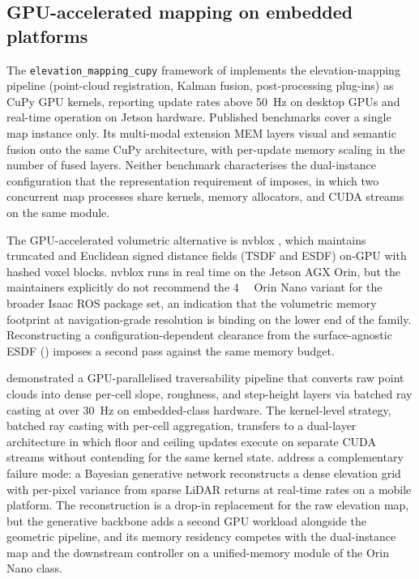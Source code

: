 \documentclass[11pt,a4paper]{article}
\begin{document}
\subsection{GPU-accelerated mapping on embedded platforms}
\label{sec:sq6:mapping}

The \texttt{elevation\_mapping\_cupy} framework of \citet{mikiElevationMappingLocomotion2022} implements the elevation-mapping pipeline (point-cloud registration, Kalman fusion, post-processing plug-ins) as CuPy GPU kernels, reporting update rates above \SI{50}{\hertz} on desktop GPUs and real-time operation on Jetson hardware. Published benchmarks cover a single map instance only. Its multi-modal extension MEM \citep{erniMEMMultiModalElevation2023} layers visual and semantic fusion onto the same CuPy architecture, with per-update memory scaling in the number of fused layers. Neither benchmark characterises the dual-instance configuration that the representation requirement of  imposes, in which two concurrent map processes share kernels, memory allocators, and CUDA streams on the same module.

The GPU-accelerated volumetric alternative is nvblox \citep{millaneNvbloxGPUAcceleratedIncremental2024}, which maintains truncated and Euclidean signed distance fields (TSDF and ESDF) on-GPU with hashed voxel blocks. nvblox runs in real time on the Jetson AGX Orin, but the maintainers explicitly do not recommend the \SI{4}{\giga\byte} Orin Nano variant for the broader Isaac ROS package set, an indication that the volumetric memory footprint at navigation-grade resolution is binding on the lower end of the family. Reconstructing a configuration-dependent clearance from the surface-agnostic ESDF () imposes a second pass against the same memory budget.

\citet{panGPUAcceleratedRealtime2019} demonstrated a GPU-parallelised traversability pipeline that converts raw point clouds into dense per-cell slope, roughness, and step-height layers via batched ray casting at over \SI{30}{\hertz} on embedded-class hardware. The kernel-level strategy, batched ray casting with per-cell aggregation, transfers to a dual-layer architecture in which floor and ceiling updates execute on separate CUDA streams without contending for the same kernel state. \citet{yangRealtimeNeuralDense2023} address a complementary failure mode: a Bayesian generative network reconstructs a dense elevation grid with per-pixel variance from sparse LiDAR returns at real-time rates on a mobile platform. The reconstruction is a drop-in replacement for the raw elevation map, but the generative backbone adds a second GPU workload alongside the geometric pipeline, and its memory residency competes with the dual-instance map and the downstream controller on a unified-memory module of the Orin Nano class.
\end{document}
